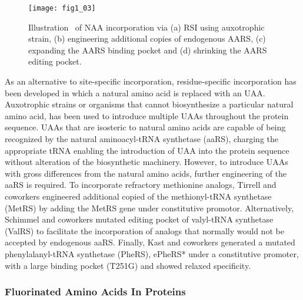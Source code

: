 \begin{refsection}
\begin{figure}[h!] \centering \texttt{[image: fig1\_03]} 
    \caption[Illustration  of NAA incorporation via (a) RSI using auxotrophic
    strain, (b) engineering additional copies of endogenous AARS, (c) expanding
the AARS binding pocket and (d) shrinking the AARS editing
pocket.]{Illustration  of NAA incorporation via (a) RSI using auxotrophic
strain, (b) engineering additional copies of endogenous AARS, (c) expanding the
AARS binding pocket and (d) shrinking the AARS editing pocket.} \label{fig:rsi}
\end{figure}

As an alternative to site-specific incorporation, residue-specific
incorporation has been developed in which a natural amino acid is replaced with
an UAA. Auxotrophic strains or organisms that cannot biosynthesize a particular
natural amino acid, has been used to introduce multiple UAAs throughout the
protein sequence. UAAs that are isosteric to natural amino acids are capable of
being recognized by the natural aminoacyl-tRNA synthetase (aaRS), charging the
appropriate tRNA enabling the introduction of UAA into the protein sequence
without alteration of the biosynthetic machinery. However, to introduce UAAs
with gross differences from the natural amino acids, further engineering of the
aaRS is required. To incorporate refractory methionine analogs, Tirrell and
coworkers engineered additional copied of the methionyl-tRNA synthetase (MetRS)
by adding the MetRS gene under constitutive promotor\cite{Kiick2000}.
Alternatively, Schimmel and coworkers mutated editing pocket of valyl-tRNA
synthetase (ValRS) to facilitate the incorporation of analogs that normally
would not be accepted by endogenous aaRS\cite{Doring2001}. Finally, Kast and
coworkers generated a mutated phenylalanyl-tRNA synthetase (PheRS), ePheRS*
under a constitutive promoter, with a large binding pocket (T251G) and showed
relaxed specificity\cite{Kast1991}.

\subsubsection{Fluorinated Amino Acids In Proteins} 
\label{sec:faa-intro}


\end{refsection}
